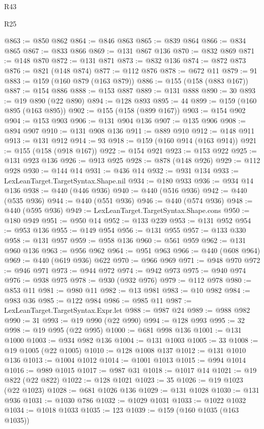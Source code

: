 \begin{lexlean}{R43}
\begin{lexlean}{R25}
\begin{coremodule}
{{{{{{{{{{{{{{{{{{{{{{{{{{{{{{{{{{{{{{{{{{{{{{{{{{{{{{{{{{{{{{{{{{{{{{{{{{{{{{{{{{{{{{{{{{{{{{{{{{{{{{{{{{{{{{{{{{{{{{{{{{{{{{{{{{{{{{{{{{{{{{{{{{{{{{{{{{{{{{{{{{{{{{{{{{{{{{{{{{{{{{{{{{{{{{{{{@863 := @850 @862
@864 := @846 @863
@865 := @839 @864
@866 := @834 @865
@867 := @833 @866
@869 := @131 @867 @136
@870 := @832 @869
@871 := @148 @870
@872 := @131 @871
@873 := @832 @136
@874 := @872 @873
@876 := @821 (@148 @874)
@877 := @112 @876
@878 := @672 @11
@879 := 91
@883 := @159 (@160 @879 (@163 @879))
@886 := @155 (@158 (@883 @167))
@887 := @154 @886
@888 := @153 @887
@889 := @131 @888
@890 := 30
@893 := @19 @890 (@22 @890)
@894 := @128 @893
@895 := 44
@899 := @159 (@160 @895 (@163 @895))
@902 := @155 (@158 (@899 @167))
@903 := @154 @902
@904 := @153 @903
@906 := @131 @904 @136
@907 := @135 @906
@908 := @894 @907
@910 := @131 @908 @136
@911 := @889 @910
@912 := @148 @911
@913 := @131 @912
@914 := 93
@918 := @159 (@160 @914 (@163 @914))
@921 := @155 (@158 (@918 @167))
@922 := @154 @921
@923 := @153 @922
@925 := @131 @923 @136
@926 := @913 @925
@928 := @878 (@148 @926)
@929 := @112 @928
@930 := @144 @14
@931 := @436 @14
@932 := @931 @134
@933 := LexLeanTarget.TargetSyntax.Shape.nil
@934 := @180 @933
@936 := @934 @14 @136
@938 := @440 (@446 @936)
@940 := @440 (@516 @936)
@942 := @440 (@535 @936)
@944 := @440 (@551 @936)
@946 := @440 (@574 @936)
@948 := @440 (@595 @936)
@949 := LexLeanTarget.TargetSyntax.Shape.cons
@950 := @180 @949
@951 := @950 @14
@952 := @133 @239
@953 := @131 @952
@954 := @953 @136
@955 := @149 @954
@956 := @131 @955
@957 := @133 @330
@958 := @131 @957
@959 := @958 @136
@960 := @561 @959
@962 := @131 @960 @136
@963 := @956 @962
@964 := @951 @963
@966 := @440 (@608 @964)
@969 := @440 (@619 @936) @622
@970 := @966 @969
@971 := @948 @970
@972 := @946 @971
@973 := @944 @972
@974 := @942 @973
@975 := @940 @974
@976 := @938 @975
@978 := @930 (@932 @976)
@979 := @112 @978
@980 := @853 @11
@981 := @980 @11
@982 := @13 @981
@983 := @10 @982
@984 := @983 @36
@985 := @122 @984
@986 := @985 @11
@987 := LexLeanTarget.TargetSyntax.Expr.let
@988 := @987 @24
@989 := @988 @982
@990 := 31
@993 := @19 @990 (@22 @990)
@994 := @128 @993
@995 := 32
@998 := @19 @995 (@22 @995)
@1000 := @681 @998 @136
@1001 := @131 @1000
@1003 := @934 @982 @136
@1004 := @131 @1003
@1005 := 33
@1008 := @19 @1005 (@22 @1005)
@1010 := @128 @1008 @137
@1012 := @131 @1010 @136
@1013 := @1004 @1012
@1014 := @1001 @1013
@1015 := @994 @1014
@1016 := @989 @1015
@1017 := @987 @31
@1018 := @1017 @14
@1021 := @19 @822 (@22 @822)
@1022 := @128 @1021
@1023 := 35
@1026 := @19 @1023 (@22 @1023)
@1028 := @681 @1026 @136
@1029 := @131 @1028
@1030 := @131 @936
@1031 := @1030 @786
@1032 := @1029 @1031
@1033 := @1022 @1032
@1034 := @1018 @1033
@1035 := 123
@1039 := @159 (@160 @1035 (@163 @1035))
}}}}}}}}}}}}}}}}}}}}}}}}}}}}}}}}}}}}}}}}}}}}}}}}}}}}}}}}}}}}}}}}}}}}}}}}}}}}}}}}}}}}}}}}}}}}}}}}}}}}}}}}}}}}}}}}}}}}}}}}}}}}}}}}}}}}}}}}}}}}}}}}}}}}}}}}}}}}}}}}}}}}}}}}}}}}}}}}}}}}}}}}}}}}}}}}}
\end{coremodule}
\end{lexlean}
\end{lexlean}
